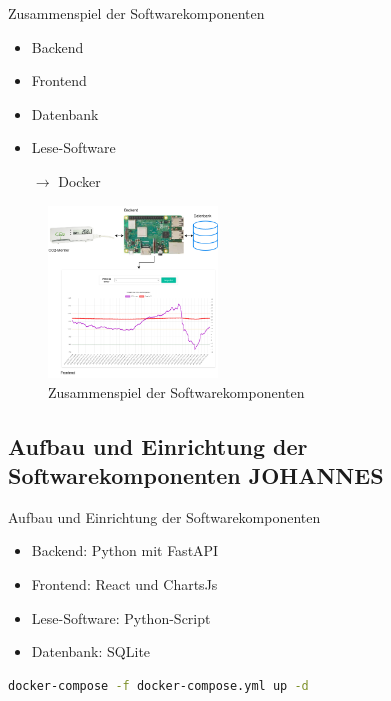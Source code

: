 \documentclass[10pt,ngerman]{beamer}
\begin{document}
\begin{frame}[fragile]{Zusammenspiel der Softwarekomponenten}

  \begin{minipage}[t]{0.29\textwidth}
    \begin{itemize}
      \item Backend
      \item Frontend
      \item Datenbank
      \item Lese-Software
      \item[$\rightarrow$] Docker
    \end{itemize}
  \end{minipage}
  \begin{minipage}[t]{0.69\textwidth}
    \begin{figure}
      \centering
      \captionsetup{justification=centering}
      \includegraphics[width=170px]{pictures/SoftwareZusammenspiel.png}
      \caption{Zusammenspiel der Softwarekomponenten}
    \end{figure}
  \end{minipage}
\end{frame}

\subsection{Aufbau und Einrichtung der Softwarekomponenten JOHANNES}

\begin{frame}[fragile]{Aufbau und Einrichtung der Softwarekomponenten}

  \begin{minipage}[t]{0.49\textwidth}
    \begin{itemize}
      \item Backend: Python mit FastAPI
      \item Frontend: React und ChartsJs
      \item Lese-Software: Python-Script
      \item Datenbank: SQLite
    \end{itemize}
  \end{minipage}

  \begin{lstlisting}[language=Bash]
    docker-compose -f docker-compose.yml up -d
  \end{lstlisting}
\end{frame}
\end{document}

